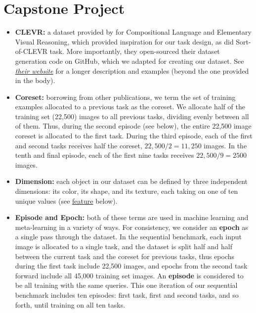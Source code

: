 \section{Capstone Project}
\begin{itemize}
\item \textbf{CLEVR:\label{tg:clevr}} a dataset provided by \textcite{Johnson2017} for Compositional Language and Elementary Visual Reasoning, which provided inspiration for our task design, as did \textcite{Santoro} Sort-of-CLEVR task. More importantly, they open-sourced their dataset generation code on GitHub, which we adapted for creating our dataset. See \href{https://cs.stanford.edu/people/jcjohns/clevr/}{\emph{their website}} for a longer description and examples (beyond the one provided in the body).
  
\item \textbf{Coreset:\label{tg:coreset}} borrowing from other publications, we term the set of training examples allocated to a previous task as the coreset. We allocate half of the training set (22,500) images to all previous tasks, dividing evenly between all of them. Thus, during the second episode (see below), the entire 22,500 image coreset is allocated to the first task. During the third episode, each of the first and second tasks receives half the coreset, $22,500 / 2 = 11,250$ images. In the tenth and final episode, each of the first nine tasks receives $22,500 / 9 = 2500$ images.
  
\item \textbf{Dimension:\label{tg:dimension}} each object in our dataset can be defined by three independent dimensions: its color, its shape, and its texture, each taking on one of ten unique values (see \hyperref[tg:feature]{feature} below). 
  
\item \textbf{Episode and Epoch:\label{tg:episode-epoch}} both of these terms are used in machine learning and meta-learning in a variety of ways. For consistency, we consider an \textbf{epoch} as a single pass through the dataset. In the sequential benchmark, each input image is allocated to a single task, and the dataset is split half and half between the current task and the coreset for previous tasks, thus epochs during the first task include 22,500 images, and epochs from the second task forward include all 45,000 training set images. An \textbf{episode} is considered to be all training with the same queries. This one iteration of our sequential benchmark includes ten episodes: first task, first and second tasks, and so forth, until training on all ten tasks.
  

\end{itemize}

